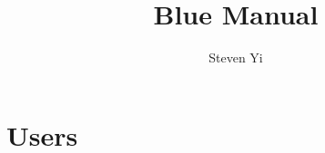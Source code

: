 \documentclass{book}
\begin{document}
\title{Blue Manual}
\author{Steven Yi}

\maketitle

\frontmatter




\tableofcontents
\listoffigures
\listoftables

\mainmatter

\part{Users}

\end{document}
